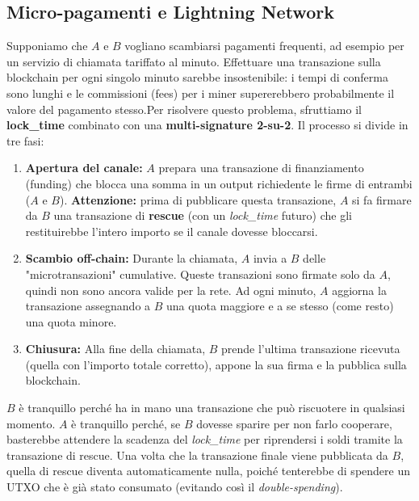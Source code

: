 \subsection{Micro-pagamenti e Lightning Network}
Supponiamo che $A$ e $B$ vogliano scambiarsi pagamenti frequenti, ad esempio per un servizio di chiamata tariffato al minuto. Effettuare una transazione sulla blockchain per ogni singolo minuto sarebbe insostenibile: i tempi di conferma sono lunghi e le commissioni (fees) per i miner supererebbero probabilmente il valore del pagamento stesso.Per risolvere questo problema, sfruttiamo il \textbf{lock\_time} combinato con una \textbf{multi-signature 2-su-2}. Il processo si divide in tre fasi:
\begin{enumerate}
    \item \textbf{Apertura del canale:} $A$ prepara una transazione di finanziamento (funding) che blocca una somma in un output richiedente le firme di entrambi ($A$ e $B$). \textbf{Attenzione:} prima di pubblicare questa transazione, $A$ si fa firmare da $B$ una transazione di \textbf{rescue} (con un \textit{lock\_time} futuro) che gli restituirebbe l'intero importo se il canale dovesse bloccarsi.
    \item \textbf{Scambio off-chain:} Durante la chiamata, $A$ invia a $B$ delle "micro\-transazioni" cumulative. Queste transazioni sono firmate solo da $A$, quindi non sono ancora valide per la rete. Ad ogni minuto, $A$ aggiorna la transazione assegnando a $B$ una quota maggiore e a se stesso (come resto) una quota minore.
    \item \textbf{Chiusura:} Alla fine della chiamata, $B$ prende l'ultima transazione ricevuta (quella con l'importo totale corretto), appone la sua firma e la pubblica sulla blockchain.
\end{enumerate}
$B$ è tranquillo perché ha in mano una transazione che può riscuotere in qualsiasi momento. $A$ è tranquillo perché, se $B$ dovesse sparire per non farlo cooperare, basterebbe attendere la scadenza del \textit{lock\_time} per riprendersi i soldi tramite la transazione di rescue. Una volta che la transazione finale viene pubblicata da $B$, quella di rescue diventa automaticamente nulla, poiché tenterebbe di spendere un UTXO che è già stato consumato (evitando così il \textit{double-spending}).

